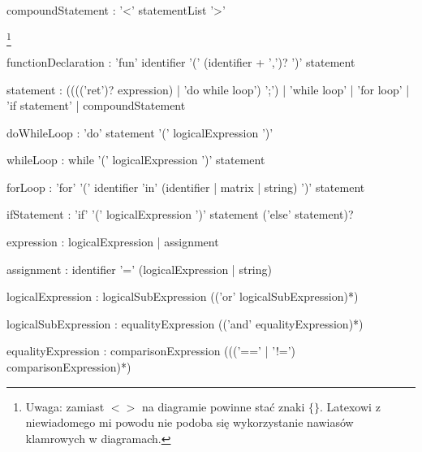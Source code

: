 \documentclass[12pt,a4paper]{article}
\begin{document}
\begin{rail}
compoundStatement : '<' statementList '>'
\end{rail} \footnote{Uwaga: zamiast \textbf{$< >$} na diagramie powinne stać znaki \textbf{$\{ \}$}. Latexowi z niewiadomego mi powodu nie podoba się wykorzystanie nawiasów klamrowych w diagramach.}

\begin{rail}
functionDeclaration : 'fun' identifier '(' (identifier + ',')?  ')' statement
\end{rail}

\begin{rail}
statement : (((('ret')? expression) | 'do while loop') ';') | 'while loop' | 'for loop' | 'if statement' | compoundStatement
\end{rail}

\begin{rail}
doWhileLoop : 'do' statement '(' logicalExpression ')'
\end{rail}

\begin{rail}
whileLoop : while '(' logicalExpression ')' statement
\end{rail}

\begin{rail}
forLoop : 'for' '(' identifier 'in' (identifier | matrix | string) ')' statement
\end{rail}

\begin{rail}
ifStatement : 'if' '(' logicalExpression ')' statement ('else' statement)?
\end{rail}

\begin{rail}
expression : logicalExpression | assignment
\end{rail}

\begin{rail}
assignment : identifier '=' (logicalExpression | string) 
\end{rail}

\begin{rail}
logicalExpression : logicalSubExpression (('or'  logicalSubExpression)*)
\end{rail}

\begin{rail}
logicalSubExpression : equalityExpression (('and'  equalityExpression)*)
\end{rail}

\begin{rail}
equalityExpression : comparisonExpression ((('==' | '!=') comparisonExpression)*)
\end{rail}
\end{document}
